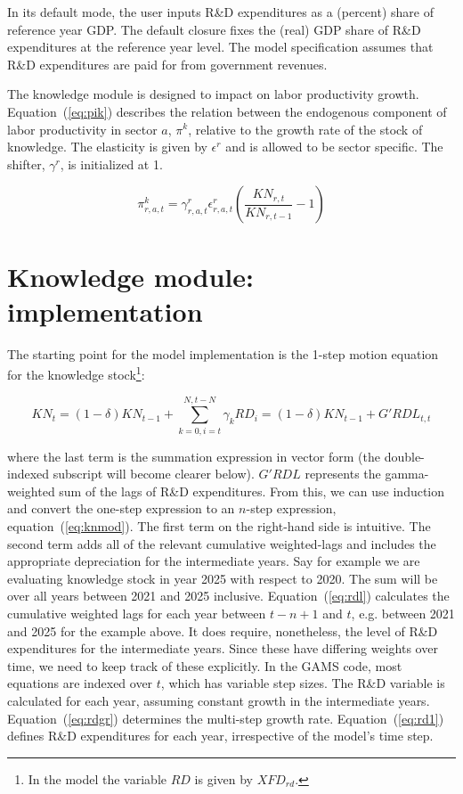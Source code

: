 \documentclass[11pt,letterpaper]{report}
\begin{document}
In its default mode, the user inputs R\&D expenditures as
a (percent) share of reference year GDP. The default closure
fixes the (real) GDP share of R\&D expenditures at the reference
year level. The model specification assumes that R\&D expenditures
are paid for from government revenues.

The knowledge module is designed to impact on labor
productivity growth. Equation~(\ref{eq:pik}) describes the relation
between the endogenous component of labor productivity
in sector $a$, $\pi^k$, relative to the growth rate of the stock
of knowledge. The elasticity is given by $\epsilon^r$ and
is allowed to be sector specific. The shifter, $\gamma^r$, is initialized
at 1.

\begin{equation}
\label{eq:pik}
\pi^k_{r,a,t} = \gamma^r_{r,a,t} \epsilon^r_{r,a,t}
\left(\frac{\mathit{KN}_{r,t}}{\mathit{KN}_{r,t-1}} - 1\right)
\end{equation}

\section{Knowledge module: implementation}
\label{sec:knowledge}

The starting point for the model implementation is the 1-step
motion equation for the knowledge stock\footnote{In the 
model the variable $\mathit{RD}$ is given by 
$\mathit{XFD}_{\mathit{rd}}$.}:

\[
\mathit{KN}_{t} = \left(1-\delta \right) \mathit{KN}_{t-1}
+ \sum_{k=0,i=t}^{N,t-N}{\gamma_k \mathit{RD}_{i}} = \left(1-\delta \right) \mathit{KN}_{t-1} + G'\mathit{RDL}_{t,t}
\]

\noindent where the last term is the summation expression in vector
form (the double-indexed subscript will become clearer below). $G'\mathit{RDL}$
represents the gamma-weighted sum of the lags of R\&D expenditures.
From this, we can use induction and convert the one-step expression to
an $n$-step expression, equation~(\ref{eq:knmod}). The first term
on the right-hand side is intuitive. The second term adds all
of the relevant cumulative weighted-lags and includes the
appropriate depreciation for the intermediate years. Say for example
we are evaluating knowledge stock in year 2025 with respect to 2020. The
sum will be over all years between 2021 and 2025 inclusive.
Equation~(\ref{eq:rdl}) calculates the cumulative weighted
lags for each year between $t-n+1$ and $t$, e.g. between
2021 and 2025 for the example above. It does require, nonetheless, the level of R\&D 
expenditures for the intermediate years. Since these have differing weights
over time, we need to keep track of these explicitly.
In the GAMS code, most equations are indexed over $t$,
which has variable step sizes. The R\&D variable is
calculated for each year, assuming constant growth
in the intermediate years. Equation~(\ref{eq:rdgr})
determines the multi-step growth rate. Equation~(\ref{eq:rd1})
defines R\&D expenditures for each year, irrespective
of the model's time step.
\end{document}
